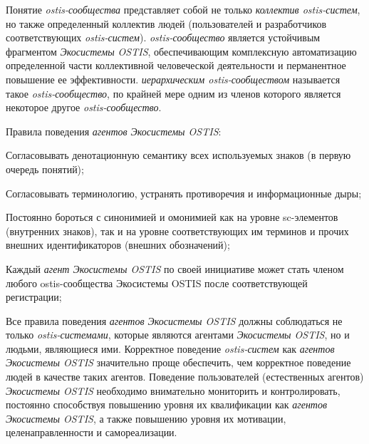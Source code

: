 Понятие \textit{ostis-сообщества} представляет собой не только \textit{коллектив ostis-систем}, но также определенный коллектив людей (пользователей и разработчиков соответствующих \textit{ostis-систем}). 
\textit{ostis-сообщество} является устойчивым фрагментом \textit{Экосистемы OSTIS}, обеспечивающим комплексную автоматизацию определенной части коллективной человеческой деятельности и перманентное повышение ее эффективности. 
\textit{иерархическим ostis-сообществом} называется такое \textit{ostis-сообщество}, по крайней мере одним из членов которого является некоторое другое \textit{ostis-сообщество}.

Правила поведения \textit{агентов Экосистемы OSTIS}:
\begin{textitemize}
    \item Согласовывать денотационную семантику всех используемых знаков (в первую очередь понятий);
    \item Согласовывать терминологию, устранять противоречия и информационные дыры;
    \item Постоянно бороться с синонимией и омонимией как на уровне sc-элементов (внутренних знаков), так и на уровне соответствующих им терминов и прочих внешних идентификаторов (внешних обозначений);
    \item Каждый \textit{агент Экосистемы OSTIS} по своей инициативе может стать членом любого ostis-сообщества Экосистемы OSTIS после соответствующей регистрации;
\end{textitemize}

Все правила поведения \textit{агентов Экосистемы OSTIS} должны соблюдаться не только \textit{ostis-системами}, которые являются агентами \textit{Экосистемы OSTIS}, но и людьми, являющиеся ими. 
Корректное поведение \textit{ostis-систем} как \textit{агентов Экосистемы OSTIS} значительно проще обеспечить, чем корректное поведение людей в качестве таких агентов. 
Поведение пользователей (естественных агентов) \textit{Экосистемы OSTIS} необходимо внимательно мониторить и контролировать, постоянно способствуя повышению уровня их квалификации как \textit{агентов Экосистемы OSTIS}, а также повышению уровня их мотивации, целенаправленности и самореализации.

